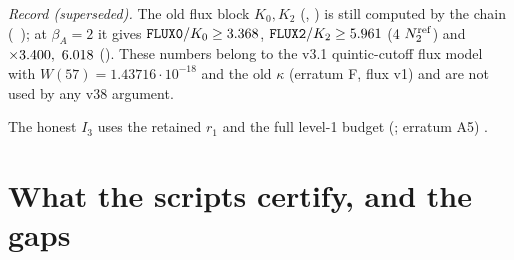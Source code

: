 \documentclass[11pt]{article}
\begin{document}
\emph{Record (superseded).} The old flux block $K_0,K_2$ (, ) is still computed by the chain (\SA\ ); at $\beta_A=2$ it gives $\fn{FLUX0}/K_0\ge\MarFluxZeroV$, $\fn{FLUX2}/K_2\ge\MarFluxTwoV$ (4 $N_2^{\rm ref}$) and $\times3.400,\ 6.018$ (). These numbers belong to the v3.1 quintic-cutoff flux model with $W(57)=1.43716\cdot10^{-18}$ and the old $\kappa$ (erratum F, flux v1) and are not used by any v38 argument.

\noindent The honest $I_3$ uses the retained $r_1$ and the full level-1 budget (; erratum A5) \tC.

\section{What the scripts certify, and the gaps}\label{A:sec:gaps}
\end{document}
